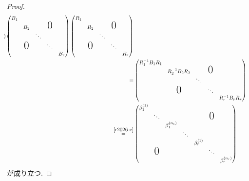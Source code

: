 \documentclass[titlepage]{jsarticle}
\numberwithin{equation}{section}
\begin{document}
\begin{proof}
\begin{align*}
\begin{pmatrix}
\end{pmatrix}
\begin{pmatrix}
B_ 1                                                           \\
         & B_2           &        & \text{\huge{0}}   \\
         &                      & \ddots                       \\
         & \text{\huge{0}} &        & \ddots             \\
         &                      &        &           & B_r
\end{pmatrix}
\begin{pmatrix}
R_ 1                                                           \\
         & R_2           &        & \text{\huge{0}}   \\
         &                      & \ddots                       \\
         & \text{\huge{0}} &        & \ddots             \\
         &                      &        &           & R_r
\end{pmatrix}\\
=
&
\begin{pmatrix}
R_ 1^{-1}B_1R_1                                                       \\
         & R_2 ^{-1} B_2 R_2         &        & \text{\huge{0}}   \\
         &                      & \ddots                       \\
         & \text{\huge{0}} &        & \ddots             \\
         &                      &        &           & R_r^{-1}B_rR_r
\end{pmatrix}\\
\stackrel{\eqref{r2026-e}}{=}
&
\begin{pmatrix}
\beta_1^{(1)}                                                      \\
            & \ddots                 &        &        &        & \text{\huge{0}} \\
            &                        & \beta_1^{(n_1)}              \\
            &                        &                & \ddots    \\
            &                        &                &           & \beta_r^{(1)} \\
            & \text{\huge{0}}        &                &           &             & \ddots \\
            &                        &                &           &             &        & \beta_r^{(n_r)}
\end{pmatrix}
\end{align*}
が成り立つ. 
\end{proof}
\end{document}
